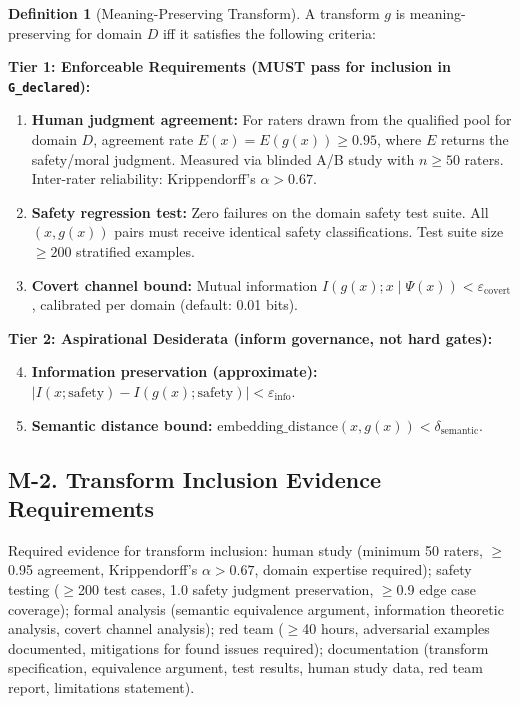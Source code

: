 \documentclass[11pt,letterpaper]{article}
\theoremstyle{definition}
\newtheorem{definition}[theorem]{Definition}
\theoremstyle{remark}
\begin{document}
\begin{definition}[Meaning-Preserving Transform]
A transform $g$ is meaning-preserving for domain $D$ iff it satisfies the following criteria:

\textbf{Tier 1: Enforceable Requirements (MUST pass for inclusion in \texttt{G\_declared}):}
\begin{enumerate}
\item \textbf{Human judgment agreement:} For raters drawn from the qualified pool for domain $D$, agreement rate $E(x) = E(g(x)) \geq 0.95$, where $E$ returns the safety/moral judgment. Measured via blinded A/B study with $n \geq 50$ raters. Inter-rater reliability: Krippendorff's $\alpha > 0.67$.
\item \textbf{Safety regression test:} Zero failures on the domain safety test suite. All $(x, g(x))$ pairs must receive identical safety classifications. Test suite size $\geq 200$ stratified examples.
\item \textbf{Covert channel bound:} Mutual information $I(g(x); x \mid \Psi(x)) < \varepsilon_{\text{covert}}$, calibrated per domain (default: 0.01 bits).
\end{enumerate}

\textbf{Tier 2: Aspirational Desiderata (inform governance, not hard gates):}
\begin{enumerate}
\setcounter{enumi}{3}
\item \textbf{Information preservation (approximate):} $|I(x; \text{safety}) - I(g(x); \text{safety})| < \varepsilon_{\text{info}}$.
\item \textbf{Semantic distance bound:} $\text{embedding\_distance}(x, g(x)) < \delta_{\text{semantic}}$.
\end{enumerate}
\end{definition}

\subsection{M-2. Transform Inclusion Evidence Requirements}

Required evidence for transform inclusion: human study (minimum 50 raters, $\geq$0.95 agreement, Krippendorff's $\alpha > 0.67$, domain expertise required); safety testing ($\geq$200 test cases, 1.0 safety judgment preservation, $\geq$0.9 edge case coverage); formal analysis (semantic equivalence argument, information theoretic analysis, covert channel analysis); red team ($\geq$40 hours, adversarial examples documented, mitigations for found issues required); documentation (transform specification, equivalence argument, test results, human study data, red team report, limitations statement).
\end{document}
